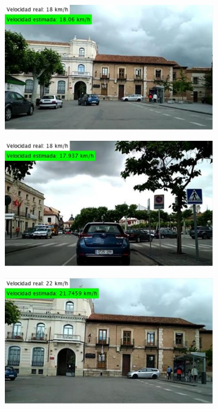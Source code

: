 \begin{figure}[H]
\centering
  \begin{subfigure}[b]{0.45\linewidth}
    \includegraphics[width=\linewidth]{Figuras/Resultado_SVR_Urbano_BIEN_1.eps}
  \end{subfigure}
  \begin{subfigure}[b]{0.45\linewidth}
    \includegraphics[width=\linewidth]{Figuras/Resultado_SVR_Urbano_BIEN_2.eps}
  \end{subfigure}
  \begin{subfigure}[b]{0.45\linewidth}
    \includegraphics[width=\linewidth]{Figuras/Resultado_SVR_Urbano_BIEN_3.eps}

\end{subfigure}
\end{figure}
